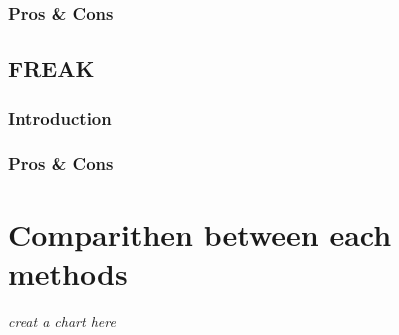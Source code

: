 		\subsubsection{Pros \& Cons}
	\subsection{FREAK}
		\subsubsection{Introduction}
		\subsubsection{Pros \& Cons}

\section{Comparithen between each methods}
\emph{creat a chart here}